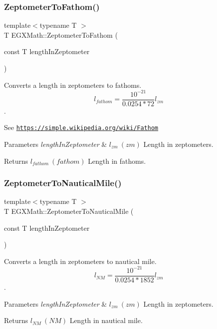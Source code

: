 \subsubsection{\texorpdfstring{Zeptometer\+To\+Fathom()}{ZeptometerToFathom()}}
{\footnotesize\ttfamily template$<$typename T $>$ \\
T E\+G\+X\+Math\+::\+Zeptometer\+To\+Fathom (\begin{DoxyParamCaption}\item[{const T}]{length\+In\+Zeptometer }\end{DoxyParamCaption})}



Converts a length in zeptometers to fathoms. \[ l_{fathom}= \frac{10^{-21}}{0.0254 * 72} l_{zm} \]. 

See \href{https://simple.wikipedia.org/wiki/Fathom}{\tt https\+://simple.\+wikipedia.\+org/wiki/\+Fathom} 
\begin{DoxyParams}{Parameters}
{\em length\+In\+Zeptometer} & $ l_{zm}\ (zm)$ Length in zeptometers. \\
\hline
\end{DoxyParams}
\begin{DoxyReturn}{Returns}
$ l_{fathom}\ (fathom)$ Length in fathoms. 
\end{DoxyReturn}
\mbox{\label{group___e_g_x_math-_conversions-_length_conversions-_zeptometer-_nautical_ga9d6a1de6b4a8de39ba16da0a17cdca42}} 
\subsubsection{\texorpdfstring{Zeptometer\+To\+Nautical\+Mile()}{ZeptometerToNauticalMile()}}
{\footnotesize\ttfamily template$<$typename T $>$ \\
T E\+G\+X\+Math\+::\+Zeptometer\+To\+Nautical\+Mile (\begin{DoxyParamCaption}\item[{const T}]{length\+In\+Zeptometer }\end{DoxyParamCaption})}



Converts a length in zeptometers to nautical mile. \[ l_{NM}= \frac{10^{-21}}{0.0254 * 1852} l_{zm} \]. 


\begin{DoxyParams}{Parameters}
{\em length\+In\+Zeptometer} & $ l_{zm}\ (zm)$ Length in zeptometers. \\
\hline
\end{DoxyParams}
\begin{DoxyReturn}{Returns}
$ l_{NM}\ (NM)$ Length in nautical mile. 
\end{DoxyReturn}
